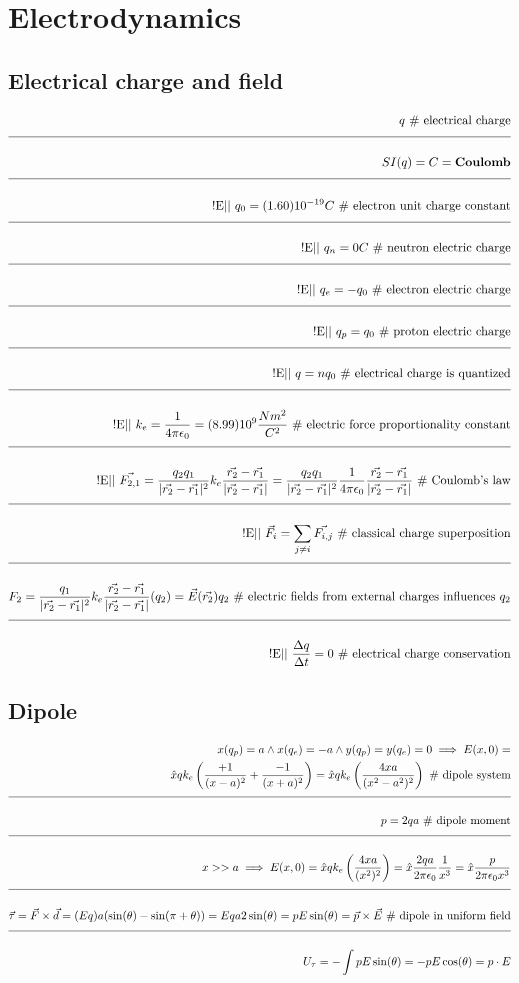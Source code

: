 \documentclass[a4paper]{article}
\newcommand{\eqComment}[1]{\text{  \# #1}}
\newcommand{\experimental}{\text{!E||  }}
\newcommand{\n}{\\[1.5ex] \hline \nonumber \\[0ex]}
\newcommand{\m}{\nonumber \\}
\begin{document}
\section{Electrodynamics}
\subsection{Electrical charge and field}
\begin{tcolorbox}
\begin{align}
   q \eqComment{electrical charge}
\n SI(q) = C = \textbf{Coulomb}
\n \experimental q_0 = (1.60) 10^{-19} C \eqComment{electron unit charge constant}
\n \experimental q_n = 0 C \eqComment{neutron electric charge}
\n \experimental q_e = -q_0 \eqComment{electron electric charge}
\n \experimental q_p = q_0 \eqComment{proton electric charge}
\n \experimental q = n q_0 \eqComment{electrical charge is quantized}
\n \experimental k_e = \frac{1}{4 \pi \epsilon_0} = (8.99) 10^9 \frac{N m^2}{C^2} \eqComment{electric force proportionality constant}
\n \experimental \vec{F_{2,1}} = \frac{q_2 q_1}{|\vec{r_2} - \vec{r_1}|^2} k_e \frac{\vec{r_2} - \vec{r_1}}{|\vec{r_2} - \vec{r_1}|} = \frac{q_2 q_1}{|\vec{r_2} - \vec{r_1}|^2} \frac{1}{4 \pi \epsilon_0} \frac{\vec{r_2} - \vec{r_1}}{|\vec{r_2} - \vec{r_1}|}  \eqComment{Coulomb's law}
\n \experimental \vec{F_i} = \sum_{j \neq i} \vec{F_{i,j}} \eqComment{classical charge superposition}
\n F_2 = \frac{q_1}{|\vec{r_2} - \vec{r_1}|^2} k_e \frac{\vec{r_2} - \vec{r_1}}{|\vec{r_2} - \vec{r_1}|} (q_2) = \vec{E}(\vec{r_2}) q_2 \eqComment{electric fields from external charges influences $q_2$}
\n \experimental \frac{\Delta q}{\Delta t} = 0 \eqComment{electrical charge conservation}
\end{align}
\end{tcolorbox}

\subsection{Dipole}
\begin{tcolorbox}
\begin{align}
   x(q_p) = a \land x(q_e) = -a \land y(q_p) = y(q_e) = 0 \implies E(x, 0) = 
\m \hat{x} q k_e \left(\frac{+1}{(x - a)^2} + \frac{-1}{(x + a)^2}\right) = \hat{x} q k_e \left(\frac{4 x a}{(x^2 - a^2)^2}\right) \eqComment{dipole system}
\n p = 2 q a \eqComment{dipole moment}
\n x >> a \implies E(x, 0) = \hat{x} q k_e \left(\frac{4 x a}{(x^2)^2}\right) = \hat{x} \frac{2 q a}{2 \pi \epsilon_0} \frac{1}{x^3} = \hat{x} \frac{p}{2 \pi \epsilon_0 x^3}
\n \vec{\tau} = \vec{F} \times \vec{d} = (E q) a (\sin(\theta) - \sin(\pi + \theta)) = E q a 2 \sin(\theta) = p E \sin(\theta) = \vec{p} \times \vec{E} \eqComment{dipole in uniform field}
\n U_\tau = -\int p E \sin(\theta) = -p E \cos(\theta) = p \cdot E
\end{align}
\end{tcolorbox}
\end{document}
